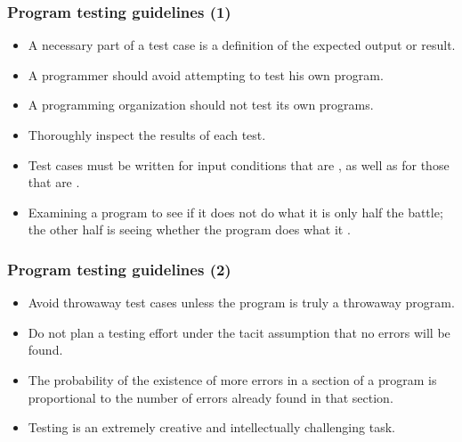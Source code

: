\documentclass{beamer}
\begin{document}
\begin{frame}[fragile]
    \frametitle{Program testing guidelines (1)}

    \begin{itemize}
        \item A necessary part of a test case is a definition of the expected
        output or result.
        \pause
        \item A programmer should avoid attempting to test his own program.
        \pause
        \item A programming organization should not test its own programs.
        \pause
        \item Thoroughly inspect the results of each test.
        \pause
        \item Test cases must be written for input conditions that are
            , as well as for those that are
            .
        \item Examining a program to see if it does not do what it  is only half the battle; the other half is seeing whether
        the program does what it .
    \end{itemize}
\end{frame}

\begin{frame}[fragile]
    \frametitle{Program testing guidelines (2)}

    \begin{itemize}
        \item Avoid throwaway test cases unless the program is truly a
        throwaway program.
        \pause
        \item Do not plan a testing effort under the tacit assumption that no
        errors will be found.
        \pause
        \item The probability of the existence of more errors in a section of a
        program is proportional to the number of errors already found in
        that section.
        \pause
        \item Testing is an extremely creative and intellectually challenging
        task.
    \end{itemize}
\end{frame}
\end{document}
